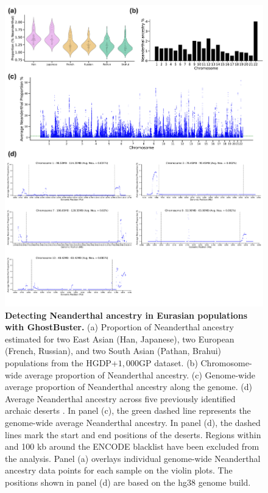 \begin{figure}
    \centering
    \includegraphics[width=\textwidth]{figures/gb_bta/gb_real_bta_15.pdf}
 \caption{\textbf{Detecting Neanderthal ancestry in Eurasian populations with GhostBuster.} (a) Proportion of Neanderthal ancestry estimated for two East Asian (Han, Japanese), two European (French, Russian), and two South Asian (Pathan, Brahui) populations from the HGDP+$1{,}000$GP dataset. (b) Chromosome-wide average proportion of Neanderthal ancestry. (c) Genome-wide average proportion of Neanderthal ancestry along the genome. (d) Average Neanderthal ancestry across five previously identified archaic deserts \cite{sankararaman2016combined,vernot2016excavating}. In panel (c), the green dashed line represents the genome-wide average Neanderthal ancestry. In panel (d), the dashed lines mark the start and end positions of the deserts. Regions within and 100 kb around the ENCODE blacklist \cite{amemiya2019encode} have been excluded from the analysis. Panel (a) overlays individual genome-wide Neanderthal ancestry data points for each sample on the violin plots. The positions shown in panel (d) are based on the hg38 genome build. }
    \label{fig:gb-bta-nea-eurasians}
\end{figure}


